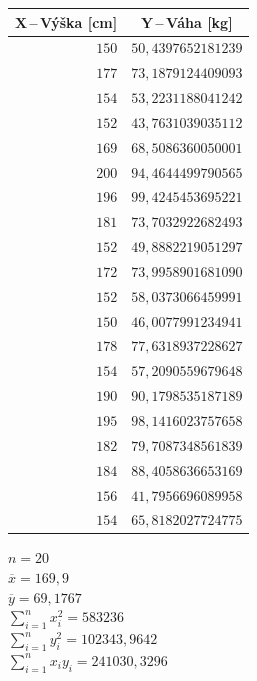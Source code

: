 \documentclass[a4paper, 11pt]{article}
\begin{document}
	\begin{table}[H]
		\begin{tabular}{|r|r|}
			\multicolumn{1}{c}{\textbf{$ \boldsymbol{X} $\,--\,Výška [cm]}}
			& \multicolumn{1}{c}{\textbf{$ \boldsymbol{Y} $\,--\,Váha [kg]}}
			\\ \hline

			$ 150 $ & $ 50,4397652181239 $ \\ \hline
			$ 177 $ & $ 73,1879124409093 $ \\ \hline
			$ 154 $ & $ 53,2231188041242 $ \\ \hline
			$ 152 $ & $ 43,7631039035112 $ \\ \hline
			$ 169 $ & $ 68,5086360050001 $ \\ \hline
			$ 200 $ & $ 94,4644499790565 $ \\ \hline
			$ 196 $ & $ 99,4245453695221 $ \\ \hline
			$ 181 $ & $ 73,7032922682493 $ \\ \hline
			$ 152 $ & $ 49,8882219051297 $ \\ \hline
			$ 172 $ & $ 73,9958901681090 $ \\ \hline
			$ 152 $ & $ 58,0373066459991 $ \\ \hline
			$ 150 $ & $ 46,0077991234941 $ \\ \hline
			$ 178 $ & $ 77,6318937228627 $ \\ \hline
			$ 154 $ & $ 57,2090559679648 $ \\ \hline
			$ 190 $ & $ 90,1798535187189 $ \\ \hline
			$ 195 $ & $ 98,1416023757658 $ \\ \hline
			$ 182 $ & $ 79,7087348561839 $ \\ \hline
			$ 184 $ & $ 88,4058636653169 $ \\ \hline
			$ 156 $ & $ 41,7956696089958 $ \\ \hline
			$ 154 $ & $ 65,8182027724775 $ \\ \hline
		\end{tabular}
	\end{table}

	$ n = 20 $ \\
	$ \overline{x} = 169,9 $ \\
	$ \overline{y} = 69,1767 $ \\
	$ \sum\limits_{i = 1}^n x_i^2 = 583236 $ \\
	$ \sum\limits_{i = 1}^n y_i^2 = 102343,9642 $ \\
	$ \sum\limits_{i = 1}^n x_i y_i = 241030,3296 $
\end{document}
